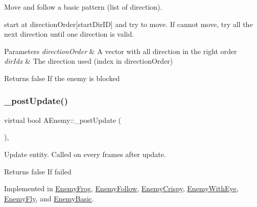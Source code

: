 Move and follow a basic pattern (list of direction). 

start at direction\+Order\mbox{[}start\+Dir\+ID\mbox{]} and try to move. If cannot move, try all the next direction until one direction is valid.


\begin{DoxyParams}{Parameters}
{\em direction\+Order} & A vector with all direction in the right order \\
\hline
{\em dir\+Idx} & The direction used (index in direction\+Order) \\
\hline
\end{DoxyParams}
\begin{DoxyReturn}{Returns}
false If the enemy is blocked 
\end{DoxyReturn}
\mbox{\label{class_a_enemy_a78b010638f552c4ab11ff71e7b826b1b}} 
\subsubsection{\texorpdfstring{\+\_\+post\+Update()}{\_postUpdate()}}
{\footnotesize\ttfamily virtual bool A\+Enemy\+::\+\_\+post\+Update (\begin{DoxyParamCaption}{ }\end{DoxyParamCaption})\hspace{0.3cm}{\ttfamily [protected]}, {}}



Update entity. Called on every frames after update. 

\begin{DoxyReturn}{Returns}
false If failed 
\end{DoxyReturn}


Implemented in \hyperlink{class_enemy_frog_ab151c31f6cc89cc77830f77b02cf9372}{Enemy\+Frog}, \hyperlink{class_enemy_follow_a7a52e753882b9bbf5cab062c606cd8d0}{Enemy\+Follow}, \hyperlink{class_enemy_crispy_a7493983cc06e648d1ac8fd80dd8c64f3}{Enemy\+Crispy}, \hyperlink{class_enemy_with_eye_a489d03612e65839940c5f468f3efdbe7}{Enemy\+With\+Eye}, \hyperlink{class_enemy_fly_a21dc66b578a2d1158b32f103854a84be}{Enemy\+Fly}, and \hyperlink{class_enemy_basic_a8c87a63172fc71e39c821a6d19eb499d}{Enemy\+Basic}.

\mbox{\label{class_a_enemy_abefc22131eb1c618819c67c3c1415c08}} 
